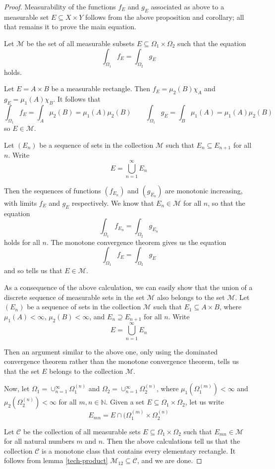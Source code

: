 \begin{proof}
Measurability of the functions $f_E$ and $g_E$ associated as above to a measurable set $E\subseteq X\times Y$ follows from the above proposition and corollary; all that remains it to prove the main equation.

Let ${\mathcal M}$ be the set of all measurable subsets $E\subseteq \Omega_1 \times \Omega_2$ such that the equation
$$\int_{\Omega_1} f_E = \int_{\Omega_2} g_E$$
holds.

Let $E=A\times B$ be a measurable rectangle.  Then $f_E = \mu_2 (B)\chi_A$ and $g_E = \mu_1 (A)\chi_B$.  It follows that
$$\int_{\Omega_1} f_E = \int_A \mu_2 (B) = \mu_1 (A) \mu_2 (B) \qquad \int_{\Omega_1} g_E = \int_B \mu_1 (A) = \mu_1 (A) \mu_2 (B)$$
so $E\in {\mathcal M}$.

Let $(E_n)$ be a sequence of sets in the collection $\mathcal M$ such that $E_n\subseteq E_{n+1}$ for all $n$.  Write
$$E= \bigcup_{n=1}^\infty E_n$$

Then the sequences of functions $(f_{E_n})$ and $(g_{E_n})$ are monotonic increasing, with limits $f_E$ and $g_E$ respectively.  We know that $E_n \in {\mathcal M}$ for all $n$, so that the equation
$$\int_{\Omega_1} f_{E_n} = \int_{\Omega_2} g_{E_n}$$
holds for all $n$.  The monotone convergence theorem gives us the equation
$$\int_{\Omega_1} f_E = \int_{\Omega_2} g_E$$
and so tells us that $E\in {\mathcal M}$.

As a consequence of the above calculation, we can easily show that the union of a discrete sequence of measurable sets in the set $\mathcal M$ also belongs to the set $\mathcal M$.  Let $(E_n)$ be a sequence of sets in the collection $\mathcal M$ such that $E_1\subseteq A\times B$, where $\mu_1 (A)<\infty$, $\mu_2 (B)<\infty$, and $E_n\supseteq E_{n+1}$ for all $n$.  Write
$$E= \bigcup_{n=1}^\infty E_n$$

Then an argument similar to the above one, only using the dominated convergence theorem rather than the monotone convergence theorem, tells us that the set $E$ belongs to the collection $\mathcal M$.

Now, let $\Omega_1 = \cup_{n=1}^\infty \Omega_1^{(n)}$ and $\Omega_2 = \cup_{n=1}^\infty \Omega_2^{(n)}$, where $\mu_1 (\Omega_1^{(m)}) <\infty$ and $\mu_2 (\Omega_2^{(n)}) <\infty$ for all $m,n\in {\mathbb N}$.  Given a set $E\subseteq \Omega_1\times \Omega_2$, let us write
$$E_{mn} = E \cap (\Omega_1^{(m)} \times \Omega_2^{(n)}$$

Let ${\mathcal C}$ be the collection of all measurable sets $E\subseteq \Omega_1 \times \Omega_2$ such that $E_{mn}\in {\mathcal M}$ for all natural numbers $m$ and $n$.  Then the above calculations tell us that the collection $\mathcal C$ is a monotone class that contains every elementary rectangle.  It follows from lemma \ref{tech-product} ${\mathcal M}_{12}\subseteq {\mathcal C}$, and we are done.
\end{proof}

